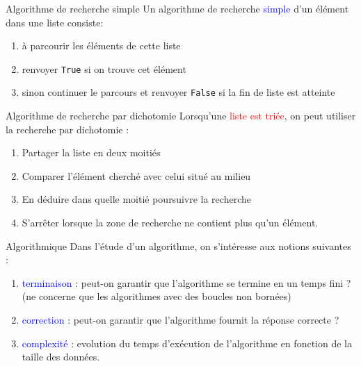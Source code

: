 \documentclass[10pt]{beamer}
\begin{document}
\begin{frame}
	\mframe{\NA}
	\begin{block}{Algorithme de recherche simple}
		Un algorithme de recherche \textcolor{blue}{simple} d'un élément dans une liste consiste:
		\begin{enumerate}
			\item<2-> à parcourir les éléments de cette liste
			\item<3-> renvoyer {\tt True} si on trouve cet élément
			\item<4-> sinon continuer le parcours et renvoyer {\tt False} si la fin de liste est atteinte
		\end{enumerate}
	\end{block}	
\end{frame}

\begin{frame}
	\mframe{\NA}
	\begin{block}{Algorithme de recherche par dichotomie}
		Lorsqu'une \textcolor{red}{liste est triée}, on peut utiliser la recherche par dichotomie :
		\begin{enumerate}
			\item<2-> Partager la liste en deux moitiés
			\item<3-> Comparer l'élément cherché avec celui situé au milieu
			\item<4-> En déduire dans quelle moitié poursuivre la recherche
			\item<5-> S'arrêter lorsque la zone de recherche ne contient plus qu'un élément.
		\end{enumerate}
	\end{block}	
\end{frame}

\begin{frame}
	\mframe{\NA}
	\begin{block}{Algorithmique}
		Dans l'étude d'un algorithme, on s'intéresse aux notions suivantes :
		\begin{enumerate}
			\item<2-> \textcolor{blue}{terminaison} : peut-on garantir que l'algorithme se termine en un temps fini ? (ne concerne que les algorithmes avec des boucles non bornées)
			\item<3-> \textcolor{blue}{correction} : peut-on garantir que l'algorithme fournit la réponse correcte ?
			\item<4-> \textcolor{blue}{complexité} : evolution du temps d'exécution de l'algorithme en fonction de la taille des données.
		\end{enumerate}
	\end{block}	
\end{frame}
\end{document}
